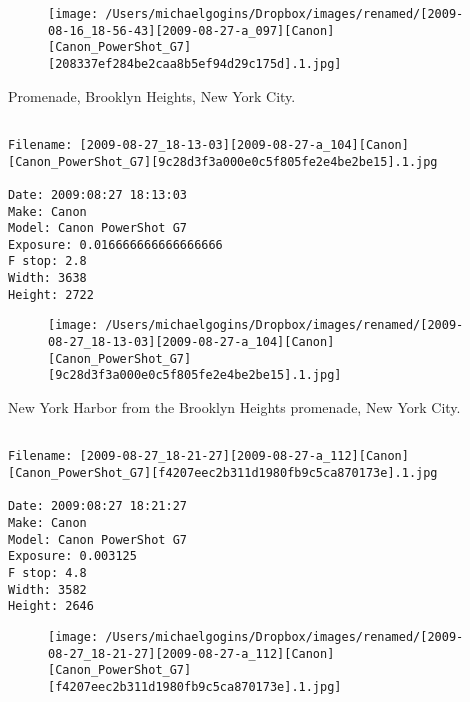 \documentclass[11pt,letter,DIV=14,paper=landscape]{scrbook}
\begin{document}
\begin{figure}
\texttt{[image: /Users/michaelgogins/Dropbox/images/renamed/[2009-08-16\_18-56-43][2009-08-27-a\_097][Canon][Canon\_PowerShot\_G7][208337ef284be2caa8b5ef94d29c175d].1.jpg]}
\end{figure}
    
\clearpage
\noindent Promenade, Brooklyn Heights, New York City.
\noindent
\begin{lstlisting}

Filename: [2009-08-27_18-13-03][2009-08-27-a_104][Canon][Canon_PowerShot_G7][9c28d3f3a000e0c5f805fe2e4be2be15].1.jpg

Date: 2009:08:27 18:13:03
Make: Canon
Model: Canon PowerShot G7
Exposure: 0.016666666666666666
F stop: 2.8
Width: 3638
Height: 2722
\end{lstlisting}
\clearpage

\begin{figure}
\texttt{[image: /Users/michaelgogins/Dropbox/images/renamed/[2009-08-27\_18-13-03][2009-08-27-a\_104][Canon][Canon\_PowerShot\_G7][9c28d3f3a000e0c5f805fe2e4be2be15].1.jpg]}
\end{figure}
    
\clearpage
\noindent New York Harbor from the Brooklyn Heights promenade, New York City.
\noindent
\begin{lstlisting}

Filename: [2009-08-27_18-21-27][2009-08-27-a_112][Canon][Canon_PowerShot_G7][f4207eec2b311d1980fb9c5ca870173e].1.jpg

Date: 2009:08:27 18:21:27
Make: Canon
Model: Canon PowerShot G7
Exposure: 0.003125
F stop: 4.8
Width: 3582
Height: 2646
\end{lstlisting}
\clearpage

\begin{figure}
\texttt{[image: /Users/michaelgogins/Dropbox/images/renamed/[2009-08-27\_18-21-27][2009-08-27-a\_112][Canon][Canon\_PowerShot\_G7][f4207eec2b311d1980fb9c5ca870173e].1.jpg]}
\end{figure}
    
\end{document}
